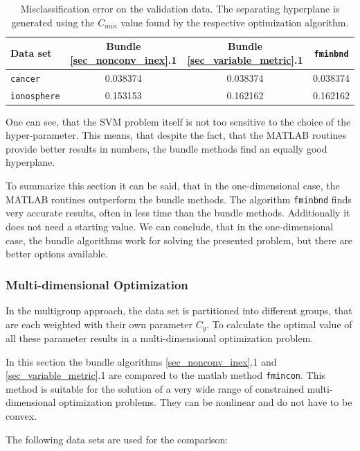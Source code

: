 \begin{table}%
\centering
\begin{tabular}{|l|c|c|c|}
	\hline
	Data set & Bundle \ref{sec_nonconv_inex}.1 & Bundle \ref{sec_variable_metric}.1 & \texttt{fminbnd}\\
	\hline
	\texttt{cancer} & 0.038374 & 0.038374 & 0.038374 \\
	\texttt{ionosphere} & 0.153153 & 0.162162 & 0.162162 \\
	\hline
\end{tabular}
\caption[Misclassification error for 1D data]{Misclassification error on the validation data. The separating hyperplane is generated using the \(C_{min}\) value found by the respective optimization algorithm.}
\label{misclass_1D}
\end{table}

One can see, that the SVM problem itself is not too sensitive to the choice of the hyper-parameter.
This means, that despite the fact, that the MATLAB routines provide better results in numbers, the bundle methods find an equally good hyperplane.

To summarize this section it can be said, that in the one-dimensional case, the MATLAB routines outperform the bundle methods. The algorithm \texttt{fminbnd} finds very accurate results, often in less time than the bundle methods. Additionally it does not need a starting value.
We can conclude, that in the one-dimensional case, the bundle algorithms work for solving the presented problem, but there are better options available.

\subsubsection{Multi-dimensional Optimization}

In the multigroup approach, the data set is partitioned into different groups, that are each weighted with their own parameter \(C_g\).
To calculate the optimal value of all these parameter results in a multi-dimensional optimization problem.

In this section the bundle algorithms \ref{sec_nonconv_inex}.1 and \ref{sec_variable_metric}.1 are compared to the matlab method \texttt{fmincon}. This method is suitable for the solution of a very wide range of constrained multi-dimensional optimization problems. They can be nonlinear and do not have to be convex.

The following data sets are used for the comparison:

